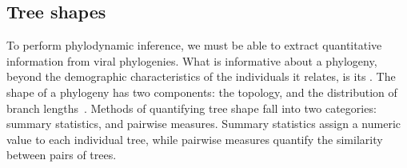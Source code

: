 
\subsection{Tree shapes}
\label{subsec:treeshape}

To perform phylodynamic inference, we must be able to extract quantitative
information from viral phylogenies. What is informative about a phylogeny,
beyond the demographic characteristics of the individuals it relates, is its
. The shape of a phylogeny has two components: the topology, and
the distribution of branch lengths~\autocite{mooers1997inferring}. Methods of
quantifying tree shape fall into two categories: summary statistics, and
pairwise measures. Summary statistics assign a numeric value to each individual
tree, while pairwise measures quantify the similarity between pairs of trees. 

